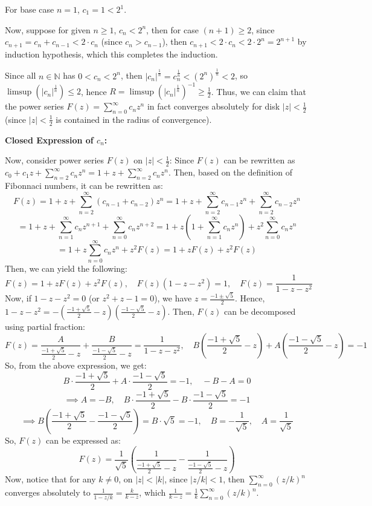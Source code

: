\documentclass{article}
\begin{document}
For base case $n=1$, $c_1=1<2^1$.

Now, suppose for given $n\geq 1$, $c_n<2^n$, then for case $(n+1)\geq 2$, since $c_{n+1}=c_n+c_{n-1} < 2\cdot c_n$ (since $c_{n}>c_{n-1}$), then $c_{n+1}<2\cdot c_n<2\cdot 2^n=2^{n+1}$
by induction hypothesis, which this completes the induction.

Since all $n\in\mathbb{N}$ has $0<c_n<2^n$, then $|c_n|^{\frac{1}{n}}=c_n^{\frac{1}{n}}<(2^n)^{\frac{1}{n}}<2$, so $\limsup(|c_n|^{\frac{1}{n}})\leq 2$, hence $R=\limsup(|c_n|^{\frac{1}{n}})^{-1}\geq\frac{1}{2}$.
Thus, we can claim that the power series $F(z)=\sum_{n=0}^{\infty}c_nz^n$ in fact converges absolutely for disk $|z|<\frac{1}{2}$ (since $|z|<\frac{1}{2}$ is contained in the radius of convergence).

\hfil

\textbf{Closed Expression of $c_n$:}

Now, consider power series $F(z)$ on $|z|<\frac{1}{2}$: Since $F(z)$ can be rewritten as $c_0+c_1z+\sum_{n=2}^{\infty}c_nz^n = 1+z+\sum_{n=2}^{\infty}c_nz^n$.
Then, based on the definition of Fibonnaci numbers, it can be rewritten as:
$$F(z)=1+z+\sum_{n=2}^{\infty}(c_{n-1}+c_{n-2})z^n = 1+z+\sum_{n=2}^{\infty}c_{n-1}z^n+\sum_{n=2}^{\infty}c_{n-2}z^n$$
$$ = 1+z+\sum_{n=1}^{\infty}c_nz^{n+1}+\sum_{n=0}^{\infty}c_nz^{n+2} = 1+z\left(1+\sum_{n=1}^{\infty}c_nz^n\right)+z^2\sum_{n=0}^{\infty}c_nz^n$$
$$=1+z\sum_{n=0}^{\infty}c_nz^n+z^2F(z) = 1+zF(z)+z^2F(z)$$
Then, we can yield the following:
$$F(z)=1+zF(z)+z^2F(z),\quad F(z)(1-z-z^2)=1,\quad F(z)=\frac{1}{1-z-z^2}$$
Now, if $1-z-z^2=0$ (or $z^2+z-1=0$), we have $z=\frac{-1\pm\sqrt{5}}{2}$. Hence, $1-z-z^2=-\left(\frac{-1+\sqrt{5}}{2}-z\right)\left(\frac{-1-\sqrt{5}}{2}-z\right)$.
Then, $F(z)$ can be decomposed using partial fraction:
$$F(z)=\frac{A}{\frac{-1+\sqrt{5}}{2}-z}+\frac{B}{\frac{-1-\sqrt{5}}{2}-z}=\frac{1}{1-z-z^2},\quad B\left(\frac{-1+\sqrt{5}}{2}-z\right)+A\left(\frac{-1-\sqrt{5}}{2}-z\right)=-1$$
So, from the above expression, we get:
$$B\cdot\frac{-1+\sqrt{5}}{2}+A\cdot \frac{-1-\sqrt{5}}{2}=-1,\quad -B-A=0$$
$$\implies A=-B,\quad B\cdot\frac{-1+\sqrt{5}}{2}-B\cdot \frac{-1-\sqrt{5}}{2}=-1$$
$$\implies B\left(\frac{-1+\sqrt{5}}{2}-\frac{-1-\sqrt{5}}{2}\right)=B\cdot \sqrt{5}=-1,\quad B=-\frac{1}{\sqrt{5}},\quad A=\frac{1}{\sqrt{5}}$$
So, $F(z)$ can be expressed as:
$$F(z)=\frac{1}{\sqrt{5}}\left(\frac{1}{\frac{-1+\sqrt{5}}{2}-z}-\frac{1}{\frac{-1-\sqrt{5}}{2}-z}\right)$$
Now, notice that for any $k\neq 0$, on $|z|<|k|$, since $|z/k|<1$, then $\sum_{n=0}^{\infty}(z/k)^n$ converges absolutely to $\frac{1}{1-z/k} = \frac{k}{k-z}$, which $\frac{1}{k-z}=\frac{1}{k}\sum_{n=0}^{\infty}(z/k)^n$.
\end{document}
